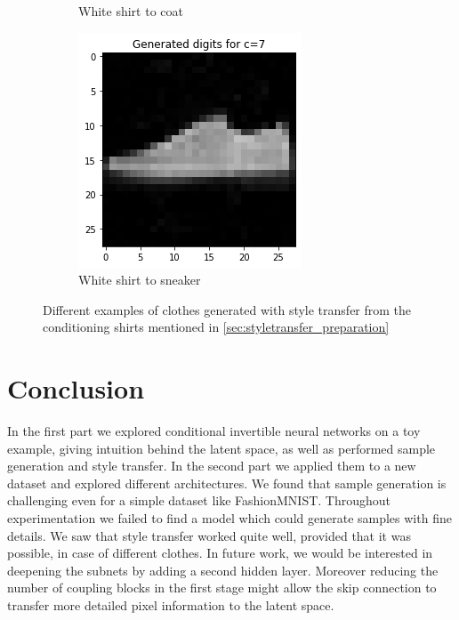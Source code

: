 \documentclass[final]{cvpr}
\begin{document}
\begin{figure}[t]
\begin{subfigure}[b]{0.475\textwidth}
		{{\small White shirt to coat}}    
		\label{fig:shirt2_coat}
	\end{subfigure}
	\hfill
	\begin{subfigure}[b]{0.475\textwidth}   
		\centering 
		\includegraphics[width=0.4\linewidth]{./figs/fashion_mnist/shirt2_to_sneaker.png}
		\caption[]%
		{{\small White shirt to sneaker}}    
		\label{fig:shirt2_sneaker}
	\end{subfigure}
	\caption[ Different examples of clothes generated with style transfer from the conditioning shirts mentioned in \ref{sec:styletransfer_preparation}]
	{\small Different examples of clothes generated with style transfer from the conditioning shirts mentioned in \ref{sec:styletransfer_preparation}} 
	\label{fig:style_transfer_samples}
\end{figure}

\section{Conclusion}
In the first part we explored conditional invertible neural networks on a toy example, giving intuition behind the latent space, as well as performed sample generation and style transfer. In the second part we applied them to a new dataset and explored different architectures. We found that sample generation is challenging even for a simple dataset like FashionMNIST. Throughout experimentation we failed to find a model which could generate samples with fine details. We saw that style transfer worked quite well, provided that it was possible, in case of different clothes. In future work, we would be interested in deepening the subnets by adding a second hidden layer. Moreover reducing the number of coupling blocks in the first stage might allow the skip connection to transfer more detailed pixel information to the latent space.

{\small


}
\end{document}
